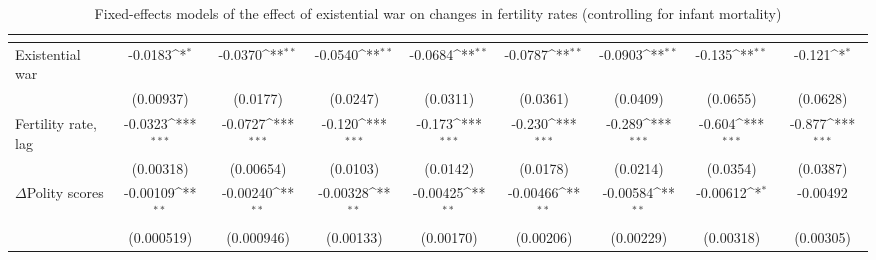 \begin{table}[htbp]\centering
\def\sym#1{\ifmmode^{#1}\else\(^{#1}\)\fi}
\caption{Fixed-effects models of the effect of existential war on changes in fertility rates (controlling for infant mortality) \label{fefertilityinfant}}
\begin{tabular}{l*{8}{c}}
\hline\hline
                    &&&&&&&&\\
\hline
Existential war    &     -0.0183\sym{*}  &     -0.0370\sym{**} &     -0.0540\sym{**} &     -0.0684\sym{**} &     -0.0787\sym{**} &     -0.0903\sym{**} &      -0.135\sym{**} &      -0.121\sym{*}  \\
                    &   (0.00937)         &    (0.0177)         &    (0.0247)         &    (0.0311)         &    (0.0361)         &    (0.0409)         &    (0.0655)         &    (0.0628)         \\
[1em]
Fertility rate, lag      &     -0.0323\sym{***}&     -0.0727\sym{***}&      -0.120\sym{***}&      -0.173\sym{***}&      -0.230\sym{***}&      -0.289\sym{***}&      -0.604\sym{***}&      -0.877\sym{***}\\
                    &   (0.00318)         &   (0.00654)         &    (0.0103)         &    (0.0142)         &    (0.0178)         &    (0.0214)         &    (0.0354)         &    (0.0387)         \\
[1em]
$\Delta$Polity scores            &    -0.00109\sym{**} &    -0.00240\sym{**} &    -0.00328\sym{**} &    -0.00425\sym{**} &    -0.00466\sym{**} &    -0.00584\sym{**} &    -0.00612\sym{*}  &    -0.00492         \\
                    &  (0.000519)         &  (0.000946)         &   (0.00133)         &   (0.00170)         &   (0.00206)         &   (0.00229)         &   (0.00318)         &   (0.00305)         \\

\end{tabular}
\end{table}
